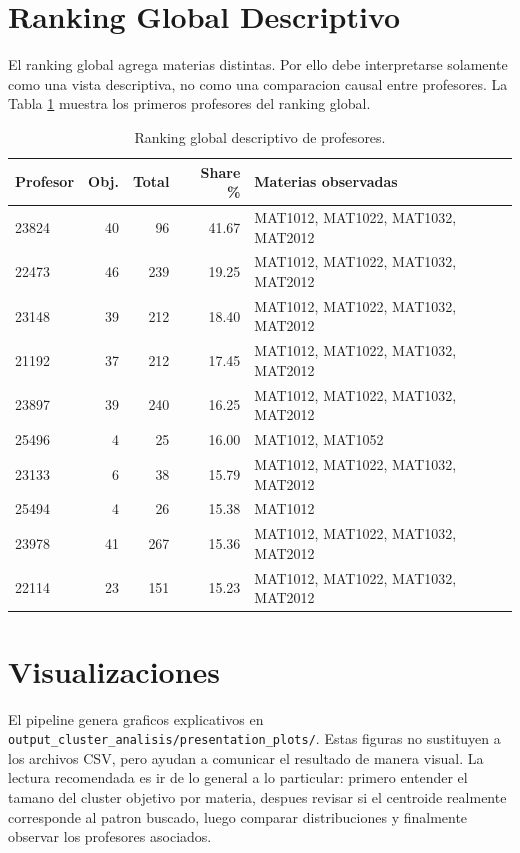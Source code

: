 \documentclass[11pt,letterpaper]{article}
\newcommand{\code}[1]{\texttt{#1}}
\begin{document}
\section{Ranking Global Descriptivo}

El ranking global agrega materias distintas. Por ello debe interpretarse solamente como una vista descriptiva, no como una comparacion causal entre profesores. La Tabla \ref{tab:ranking-global} muestra los primeros profesores del ranking global.

\begin{table}[H]
\centering
\small
\caption{Ranking global descriptivo de profesores.}
\label{tab:ranking-global}
\begin{tabular}{lrrrl}
\toprule
Profesor & Obj. & Total & Share \% & Materias observadas \\
\midrule
23824 & 40 & 96  & 41.67 & MAT1012, MAT1022, MAT1032, MAT2012 \\
22473 & 46 & 239 & 19.25 & MAT1012, MAT1022, MAT1032, MAT2012 \\
23148 & 39 & 212 & 18.40 & MAT1012, MAT1022, MAT1032, MAT2012 \\
21192 & 37 & 212 & 17.45 & MAT1012, MAT1022, MAT1032, MAT2012 \\
23897 & 39 & 240 & 16.25 & MAT1012, MAT1022, MAT1032, MAT2012 \\
25496 & 4  & 25  & 16.00 & MAT1012, MAT1052 \\
23133 & 6  & 38  & 15.79 & MAT1012, MAT1022, MAT1032, MAT2012 \\
25494 & 4  & 26  & 15.38 & MAT1012 \\
23978 & 41 & 267 & 15.36 & MAT1012, MAT1022, MAT1032, MAT2012 \\
22114 & 23 & 151 & 15.23 & MAT1012, MAT1022, MAT1032, MAT2012 \\
\bottomrule
\end{tabular}
\end{table}

\section{Visualizaciones}

El pipeline genera graficos explicativos en \code{output\_cluster\_analisis/presentation\_plots/}. Estas figuras no sustituyen a los archivos CSV, pero ayudan a comunicar el resultado de manera visual. La lectura recomendada es ir de lo general a lo particular: primero entender el tamano del cluster objetivo por materia, despues revisar si el centroide realmente corresponde al patron buscado, luego comparar distribuciones y finalmente observar los profesores asociados.
\end{document}
